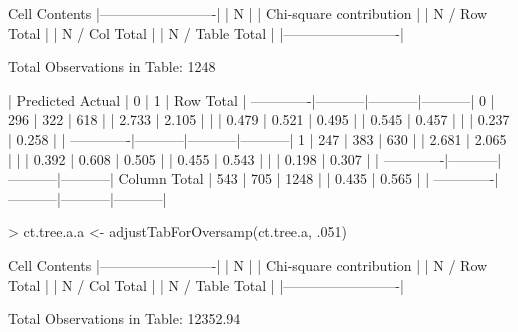 \documentclass{article}
\begin{document}
\begin{Schunk}
\begin{Soutput}
   Cell Contents
|-------------------------|
|                       N |
| Chi-square contribution |
|           N / Row Total |
|           N / Col Total |
|         N / Table Total |
|-------------------------|

 
Total Observations in Table:  1248 

 
             | Predicted 
      Actual |         0 |         1 | Row Total | 
-------------|-----------|-----------|-----------|
           0 |       296 |       322 |       618 | 
             |     2.733 |     2.105 |           | 
             |     0.479 |     0.521 |     0.495 | 
             |     0.545 |     0.457 |           | 
             |     0.237 |     0.258 |           | 
-------------|-----------|-----------|-----------|
           1 |       247 |       383 |       630 | 
             |     2.681 |     2.065 |           | 
             |     0.392 |     0.608 |     0.505 | 
             |     0.455 |     0.543 |           | 
             |     0.198 |     0.307 |           | 
-------------|-----------|-----------|-----------|
Column Total |       543 |       705 |      1248 | 
             |     0.435 |     0.565 |           | 
-------------|-----------|-----------|-----------|
\end{Soutput}
\begin{Sinput}
> ct.tree.a.a <- adjustTabForOversamp(ct.tree.a, .051)
\end{Sinput}
\begin{Soutput}
   Cell Contents
|-------------------------|
|                       N |
| Chi-square contribution |
|           N / Row Total |
|           N / Col Total |
|         N / Table Total |
|-------------------------|

 
Total Observations in Table:  12352.94 


\end{Soutput}
\end{Schunk}
\end{document}
